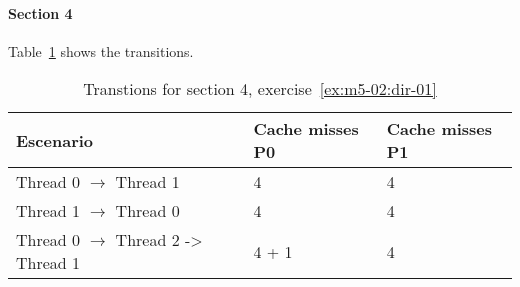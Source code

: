 \paragraph{Section 4}

Table~\ref{tab:ex:m5-02:dir-01:d}  shows the transitions. 

\begin{table}[htbp]

\begin{tabular}{|l|l|l|}

\hline
Escenario & Cache misses P0 & Cache misses P1\\
\hline
\hline

Thread 0 $\rightarrow$ Thread 1 &
4 & 4
\\
\hline

Thread 1 $\rightarrow$ Thread 0 &
4 & 4
\\
\hline

Thread 0 $\rightarrow$ Thread 2 -> Thread 1 &
4 + 1 & 4
\\
\hline

\end{tabular}

\caption{Transtions for section 4, exercise~\ref{ex:m5-02:dir-01}}
\label{tab:ex:m5-02:dir-01:d}
\end{table}


